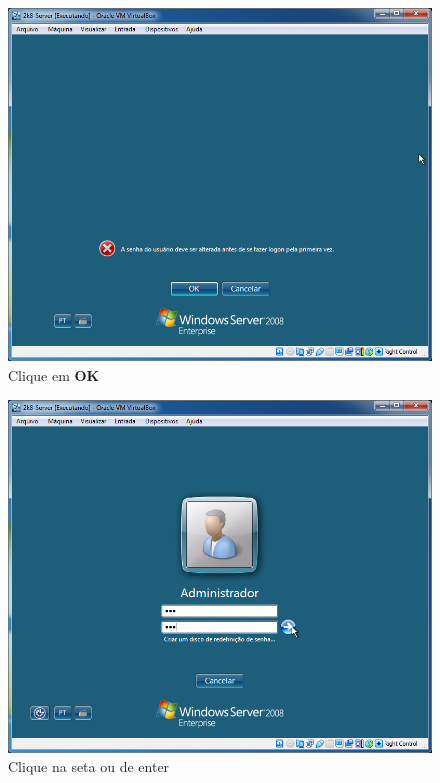 \documentclass[10pt]{article}
\begin{document}
\begin{figure}[H]
    \centering
    \caption{Clique em \textbf{OK}}
    \label{fig:3126}
    \includegraphics[width=\linewidth]{images/ativacao_das_maquinas_virtuais/configuracao_inicial_das_maquinas_virtuais/026.png}
\end{figure}
\begin{figure}[H]
    \centering
    \caption{Clique na seta ou de enter}
    \label{fig:3127}
    \includegraphics[width=\linewidth]{images/ativacao_das_maquinas_virtuais/configuracao_inicial_das_maquinas_virtuais/027.png}
\end{figure}
\end{document}
